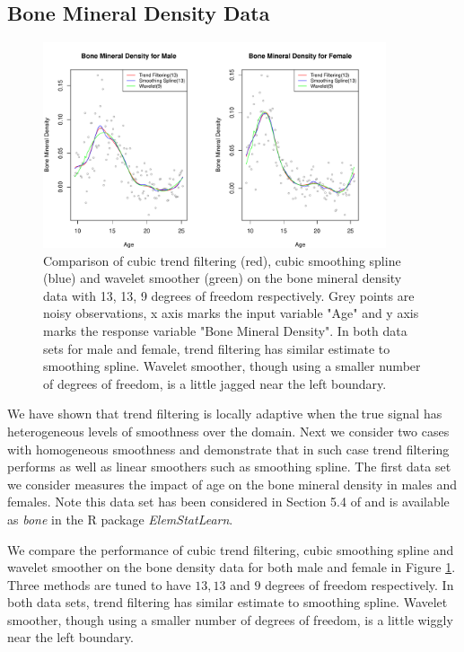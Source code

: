 \documentclass[a4paper]{article}
\begin{document}
\subsection{Bone Mineral Density Data}
\label{subsec:bone}

\begin{figure}[t!]
\centering
\includegraphics[width = 0.9\textwidth]{Figures/Figure9b.pdf}
\caption{Comparison of cubic trend filtering (red), cubic smoothing spline (blue) and wavelet smoother (green) on the bone mineral density data with 13, 13, 9 degrees of freedom respectively. Grey points are noisy observations, x axis marks the input variable "Age" and y axis marks the response variable "Bone Mineral Density". In both data sets for male and female, trend filtering has similar estimate to smoothing spline. Wavelet smoother, though using a smaller number of degrees of freedom, is a little jagged near the left boundary.}
\label{fig:real_bone}
\end{figure}
We have shown that trend filtering is locally adaptive when the true signal has heterogeneous levels of smoothness over the domain. Next we consider two cases with homogeneous smoothness and demonstrate that in such case trend filtering performs as well as linear smoothers such as smoothing spline. The first data set we consider measures the impact of age on the bone mineral density in males and females. Note this data set has been considered in Section 5.4 of \cite{friedman2001elements} and is available as \textit{bone} in the R package \textit{ElemStatLearn}. 

We compare the performance of cubic trend filtering, cubic smoothing spline and wavelet smoother on the bone density data for both male and female in Figure \ref{fig:real_bone}. Three methods are tuned to have $13, 13$ and $9$ degrees of freedom respectively. In both data sets, trend filtering has similar estimate to smoothing spline. Wavelet smoother, though using a smaller number of degrees of freedom, is a little wiggly near the left boundary.
\end{document}
